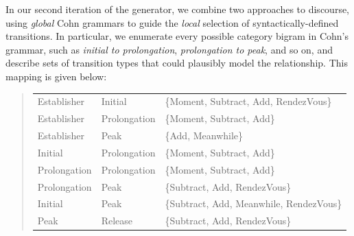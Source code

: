 \noindent In our second iteration of the generator, we combine two
approaches to discourse, using {\em global} Cohn grammars to guide the {\em
local} selection of syntactically-defined transitions.
%
%
In particular, we enumerate every possible category bigram in Cohn's grammar,
such as {\em initial to prolongation}, {\em prolongation to peak}, and so
on, and describe sets of transition types that could plausibly model the
relationship. This mapping is given below:


\begin{quotation}
{\small
\begin{tabular}{lll}
Establisher & Initial & \{Moment, Subtract, Add, RendezVous\} \\
   Establisher & Prolongation & \{Moment, Subtract, Add\} \\
   Establisher & Peak & \{Add, Meanwhile\} \\
   Initial & Prolongation & \{Moment, Subtract, Add\} \\
   Prolongation & Prolongation & \{Moment, Subtract, Add\} \\
   Prolongation & Peak & \{Subtract, Add, RendezVous\} \\
   Initial & Peak & \{Subtract, Add, Meanwhile, RendezVous\} \\
   Peak & Release & \{Subtract, Add, RendezVous\}
\end{tabular}
}
\end{quotation}


